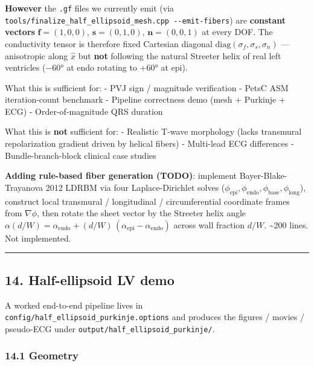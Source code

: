 \documentclass[
  11pt,
]{article}
\begin{document}
\textbf{However} the \texttt{.gf} files we currently emit (via
\texttt{tools/finalize\_half\_ellipsoid\_mesh.cpp\ -\/-emit-fibers}) are
\textbf{constant vectors} \(\mathbf{f}=(1,0,0)\),
\(\mathbf{s}=(0,1,0)\), \(\mathbf{n}=(0,0,1)\) at every DOF. The
conductivity tensor is therefore fixed Cartesian diagonal
\(\mathrm{diag}(\sigma_f, \sigma_s, \sigma_n)\) --- anisotropic along
\(\hat{x}\) but \textbf{not} following the natural Streeter helix of
real left ventricles (\(-60°\) at endo rotating to \(+60°\) at epi).

What this is sufficient for: - PVJ sign / magnitude verification - PetsC
ASM iteration-count benchmark - Pipeline correctness demo (mesh +
Purkinje + ECG) - Order-of-magnitude QRS duration

What this is \textbf{not} sufficient for: - Realistic T-wave morphology
(lacks transmural repolarization gradient driven by helical fibers) -
Multi-lead ECG differences - Bundle-branch-block clinical case studies

\textbf{Adding rule-based fiber generation (TODO)}: implement
Bayer-Blake- Trayanova 2012 LDRBM via four Laplace-Dirichlet solves
(\(\phi_\mathrm{epi}, \phi_\mathrm{endo}, \phi_\mathrm{base}, \phi_\mathrm{long}\)),
construct local transmural / longitudinal / circumferential coordinate
frames from \(\nabla\phi\), then rotate the sheet vector by the Streeter
helix angle
\(\alpha(d/W) = \alpha_\mathrm{endo} + (d/W)\, (\alpha_\mathrm{epi} - \alpha_\mathrm{endo})\)
across wall fraction \(d/W\). \textasciitilde200 lines. Not implemented.

\begin{center}\rule{0.5\linewidth}{0.5pt}\end{center}

\hypertarget{half-ellipsoid-lv-demo}{%
\subsection{14. Half-ellipsoid LV demo}\label{half-ellipsoid-lv-demo}}

A worked end-to-end pipeline lives in
\texttt{config/half\_ellipsoid\_purkinje.options} and produces the
figures / movies / pseudo-ECG under
\texttt{output/half\_ellipsoid\_purkinje/}.

\hypertarget{geometry}{%
\subsubsection{14.1 Geometry}\label{geometry}}
\end{document}
